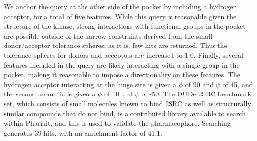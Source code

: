   We anchor the query at the other side of the pocket by including a hydrogen acceptor, for a total of five features. While this query is reasonable given the structure of the kinase, strong interactions with functional groups in the pocket are possible outside of the narrow constraints derived from the small donor/acceptor tolerance spheres; as it is, few hits are returned. Thus the tolerance spheres for donors and acceptors are increased to 1.0. Finally, several features included in the query are likely interacting with a single group in the pocket, making it reasonable to impose a directionality on these features. The hydrogen acceptor interacting at the hinge site is given a $\phi$ of 90 and $\psi$ of 45, and the second aromatic is given a $\phi$ of 10 and $\psi$ of -50. The DUDe 2SRC benchmark set, which consists of small molecules known to bind 2SRC as well as structurally similar compounds that do not bind, is a contributed library available to search within Pharmit, and this is used to validate the pharmacophore. Searching generates 39 hits, with an enrichment factor of 41.1. 